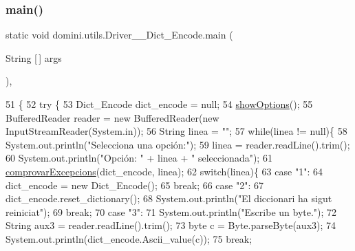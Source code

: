 \subsubsection{\texorpdfstring{main()}{main()}}
{\footnotesize\ttfamily static void domini.\+utils.\+Driver\+\_\+\+\_\+\+Dict\+\_\+\+Encode.\+main (\begin{DoxyParamCaption}\item[{String \mbox{[}$\,$\mbox{]}}]{args }\end{DoxyParamCaption})\hspace{0.3cm}{\ttfamily [inline]}, {\ttfamily [static]}}


\begin{DoxyCode}
51                                            \{
52     \textcolor{keywordflow}{try} \{
53         Dict\_Encode dict\_encode = null;
54         \hyperlink{classdomini_1_1utils_1_1Driver____Dict__Encode_a8b24c280193457c6620b2b5906018c34}{showOptions}();
55         BufferedReader reader = \textcolor{keyword}{new} BufferedReader(\textcolor{keyword}{new} InputStreamReader(System.in));
56         String linea = \textcolor{stringliteral}{""};
57         \textcolor{keywordflow}{while}(linea != null)\{
58             System.out.println(\textcolor{stringliteral}{"Selecciona una opción:"});
59             linea = reader.readLine().trim();
60             System.out.println(\textcolor{stringliteral}{"Opción: "} + linea + \textcolor{stringliteral}{" seleccionada"});
61             \hyperlink{classdomini_1_1utils_1_1Driver____Dict__Encode_ab67e87f26a75c12e50130a5e5facb52e}{comprovarExcepcions}(dict\_encode, linea);
62             \textcolor{keywordflow}{switch}(linea)\{
63                 \textcolor{keywordflow}{case} \textcolor{stringliteral}{"1"}:
64                     dict\_encode = \textcolor{keyword}{new} Dict\_Encode();
65                 \textcolor{keywordflow}{break};
66                 \textcolor{keywordflow}{case} \textcolor{stringliteral}{"2"}:
67                     dict\_encode.reset\_dictionary();
68                     System.out.println(\textcolor{stringliteral}{"El diccionari ha sigut reiniciat"});
69                 \textcolor{keywordflow}{break};
70                 \textcolor{keywordflow}{case} \textcolor{stringliteral}{"3"}:
71                     System.out.println(\textcolor{stringliteral}{"Escribe un byte."});
72                     String aux3 = reader.readLine().trim();
73                     byte c = Byte.parseByte(aux3);
74                     System.out.println(dict\_encode.Ascii\_value(c));
75                 \textcolor{keywordflow}{break};

\end{DoxyCode}
